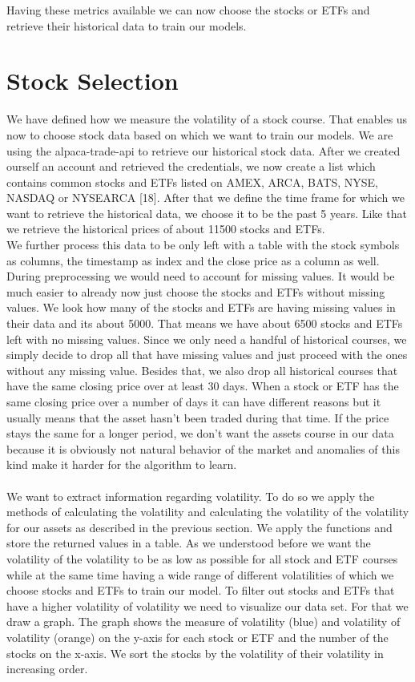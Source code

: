 \documentclass[a4paper,12pt]{report}
\begin{document}
Having these metrics available we can now choose the stocks or ETFs and retrieve their historical data to train our models.


	\section{Stock Selection}
	We have defined how we measure the volatility of a stock course. That enables us now to choose stock data based on which we want to train our models. We are using the alpaca-trade-api to retrieve our historical stock data. After we created ourself an account and retrieved the credentials, we now create a list which contains common stocks and ETFs listed on AMEX, ARCA, BATS, NYSE, NASDAQ or NYSEARCA [18]. After that we define the time frame for which we want to retrieve the historical data, we choose it to be the past 5 years. Like that we retrieve the historical prices of about 11500 stocks and ETFs. \\
	We further process this data to be only left with a table with the stock symbols as columns, the timestamp as index and the close price as a column as well. During preprocessing we would need to account for missing values. It would be much easier to already now just choose the stocks and ETFs without missing values. We look how many of the stocks and ETFs are having missing values in their data and its about 5000. That means we have about 6500 stocks and ETFs left with no missing values. Since we only need a handful of historical courses, we simply decide to drop all that have missing values and just proceed with the ones without any missing value. Besides that, we also drop all historical courses that have the same closing price over at least 30 days. When a stock or ETF has the same closing price over a number of days it can have different reasons but it usually means that the asset hasn’t been traded during that time. If the price stays the same for a longer period, we don’t want the assets course in our data because it is obviously not natural behavior of the market and anomalies of this kind make it harder for the algorithm to learn. \\\\
	
	We want to extract information regarding volatility. To do so we apply the methods of calculating the volatility and calculating the volatility of the volatility for our assets as described in the previous section. We apply the functions and store the returned values in a table. As we understood before we want the volatility of the volatility to be as low as possible for all stock and ETF courses while at the same time having a wide range of different volatilities of which we choose stocks and ETFs to train our model. To filter out stocks and ETFs that have a higher volatility of volatility we need to visualize our data set. For that we draw a graph. The graph shows the measure of volatility (blue) and volatility of volatility (orange) on the y-axis for each stock or ETF and the number of the stocks on the x-axis. We sort the stocks by the volatility of their volatility in increasing order.\\
	
\end{document}
